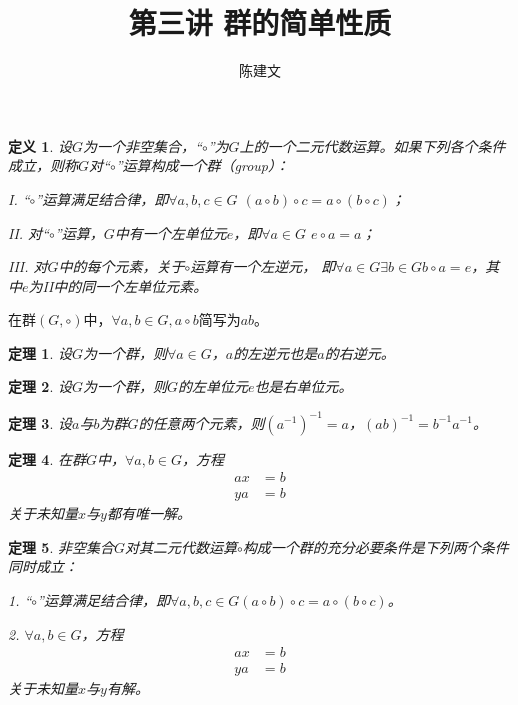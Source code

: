 \documentclass{article}
\newtheorem{Def}{定义}
\newtheorem{Thm}{定理}
\begin{document}
\begin{CJK*}{UTF8}{gbsn}
  \title{第三讲 群的简单性质}
  \author{陈建文}
  \maketitle
  

\begin{Def}
  设$G$为一个非空集合，“$\circ$”为$G$上的一个二元代数运算。如果下列各个条件成立，则称$G$对“$\circ$”运算构成一个群（group）：

  I. “$\circ$”运算满足结合律，即$\forall a,b,c \in G$ $(a\circ b)\circ c = a\circ(b\circ c)$；

  II. 对“$\circ$”运算，$G$中有一个左单位元$e$，即$\forall a\in G$ $e\circ a = a$；

  III. 对$G$中的每个元素，关于$\circ$运算有一个左逆元，
  即$\forall a\in G \exists b\in G b\circ a = e$，其中$e$为II中的同一个左单位元素。
\end{Def}
在群$(G,\circ)$中，$\forall a,b\in G, a\circ b$简写为$ab$。
\begin{Thm}
  设$G$为一个群，则$\forall a\in G$，$a$的左逆元也是$a$的右逆元。
\end{Thm}

\begin{Thm}
  设$G$为一个群，则$G$的左单位元$e$也是右单位元。
\end{Thm}

\begin{Thm}
  设$a$与$b$为群$G$的任意两个元素，则$(a^{-1})^{-1}=a$，$(ab)^{-1}=b^{-1}a^{-1}$。
\end{Thm}
\begin{Thm}
 在群$G$中，$\forall a, b \in G$，方程
 \begin{align*}
  ax&=b\\
  ya&=b
 \end{align*}
 关于未知量$x$与$y$都有唯一解。 
\end{Thm}

\begin{Thm}
  非空集合$G$对其二元代数运算$\circ$构成一个群的充分必要条件是下列两个条件同时成立：

  1. “$\circ$”运算满足结合律，即$\forall a,b,c\in G (a\circ b)\circ c=a\circ(b\circ c)$。

  2. $\forall a,b\in G$，方程
  \begin{align*}
    ax&=b\\
    ya&=b
   \end{align*}
   关于未知量$x$与$y$有解。
\end{Thm}


\end{CJK*}
\end{document}
